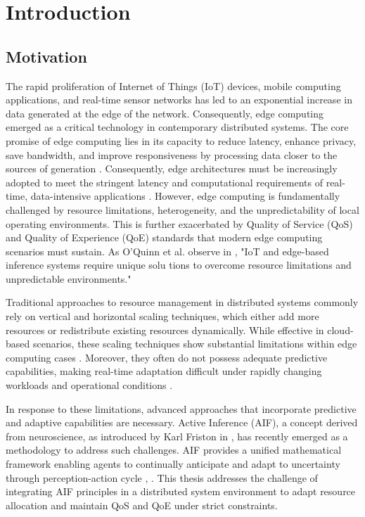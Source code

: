 \chapter{Introduction}

\section{Motivation}
The rapid proliferation of Internet of Things (IoT) devices, mobile computing applications, and real-time sensor networks has led to an exponential increase in data generated at the edge of the network. Consequently, edge computing emerged as a critical technology in contemporary distributed systems. The core promise of edge computing lies in its capacity to
reduce latency, enhance privacy, save bandwidth, and improve responsiveness by processing data closer to the sources of generation \cite{deng_edge_2020}. Consequently, edge architectures must be increasingly adopted to meet the
stringent latency and computational requirements of real-time, data-intensive applications \cite{sedlak_active_2024}. However, edge computing is fundamentally challenged by resource limitations, heterogeneity, and the unpredictability of local operating environments. This is further exacerbated by Quality of Service (QoS) and Quality of Experience (QoE) standards that modern edge computing scenarios must sustain. As O’Quinn et al. observe in \cite{oquinn_environment-aware_2025}, "IoT and edge-based inference systems require unique solu
tions to overcome resource limitations and unpredictable environments." 

Traditional approaches to resource management in distributed systems commonly rely on
vertical and horizontal scaling techniques, which either add more resources or redistribute
existing resources dynamically. While effective in cloud-based scenarios, these scaling
techniques show substantial limitations within edge computing cases \cite{xu_coscal_2022}. Moreover, they often do not possess adequate predictive capabilities, making real-time
adaptation difficult under rapidly changing workloads and operational conditions \cite{oquinn_environment-aware_2025}.

In response to these limitations, advanced approaches that incorporate predictive and adaptive
capabilities are necessary. Active Inference (AIF), a concept derived from neuroscience, as introduced by Karl Friston in \cite{friston_free-energy_2010}, has recently emerged as a methodology to address such challenges. AIF provides a unified mathematical framework enabling agents to
continually anticipate and adapt to uncertainty through perception-action cycle \cite{friston_active_2016}, \cite{lanillos_active_2021}. This thesis addresses the challenge of integrating AIF principles in a distributed system environment to adapt resource allocation and maintain QoS and QoE under strict constraints.

